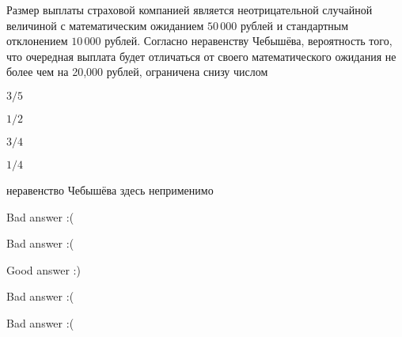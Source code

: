 
\begin{question}
Размер выплаты страховой компанией является неотрицательной случайной
величиной с математическим ожиданием \(50\,000\) рублей и стандартным
отклонением \(10\,000\) рублей. Согласно неравенству Чебышёва,
вероятность того, что очередная выплата будет отличаться от своего
математического ожидания не более чем на 20,000 рублей, ограничена снизу
числом
\begin{answerlist}
  \item \(3/5\)
  \item \(1/2\)
  \item \(3/4\)
  \item \(1/4\)
  \item неравенство Чебышёва здесь неприменимо
\end{answerlist}
\end{question}

\begin{solution}
\begin{answerlist}
  \item Bad answer :(
  \item Bad answer :(
  \item Good answer :)
  \item Bad answer :(
  \item Bad answer :(
\end{answerlist}
\end{solution}

